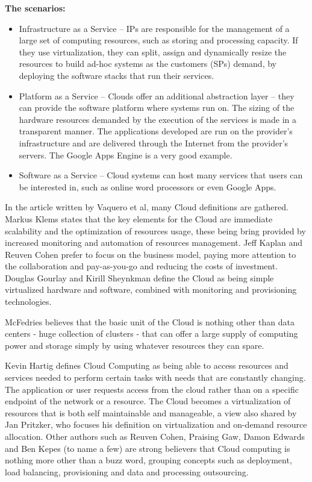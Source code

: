 \textbf{The scenarios:}
\begin{itemize}
\item Infrastructure as a Service – IPs are responsible for the management of a large set of computing resources, such as storing and processing capacity. If they use virtualization, they can split, assign and dynamically resize the resources to build ad-hoc systems as the customers (SPs) demand, by deploying the software stacks that run their services.
\item Platform as a Service – Clouds offer an additional abstraction layer – they can provide the software platform where systems run on. The sizing of the hardware resources demanded by the execution of the services is made in a transparent manner. The applications developed are run on the provider's infrastructure and are delivered through the Internet from the provider's servers. The Google Apps Engine is a very good example.
\item Software as a Service – Cloud systems can host many services that users can be interested in, such as online word processors or even Google Apps. \cite{knorr,vaquero}
\end{itemize}

In the article written by Vaquero et al, many Cloud definitions are gathered. Markus Klems states that the key elements for the Cloud are immediate scalability and the optimization of resources usage, these being bring provided by increased monitoring and automation of resources management. Jeff Kaplan and Reuven Cohen prefer to focus on the business model, paying more attention to the collaboration and pay-as-you-go and reducing the costs of investment. Douglas Gourlay and Kirill Sheynkman define the Cloud as being simple virtualized hardware and software, combined with monitoring and provisioning technologies. \cite{21experts,vaquero}

McFedries believes that the basic unit of the Cloud is nothing other than data centers - huge collection of clusters - that can offer a large supply of computing power and storage simply by using whatever resources they can spare.\cite{ieees}

Kevin Hartig defines Cloud Computing as being able to access resources and services needed to perform certain tasks with needs that are constantly changing. The application or user requests access from the cloud rather than on a specific endpoint of the network or a resource. The Cloud becomes a virtualization of resources that is both self maintainable and manageable, a view also shared by Jan Pritzker, who focuses his definition on virtualization and on-demand resource allocation. Other authors such as Reuven Cohen, Praising Gaw, Damon Edwards and Ben Kepes (to name a few) are strong believers that Cloud computing is nothing more other than a buzz word, grouping concepts such as deployment, load balancing, provisioning and data and processing outsourcing.\cite{21experts}

